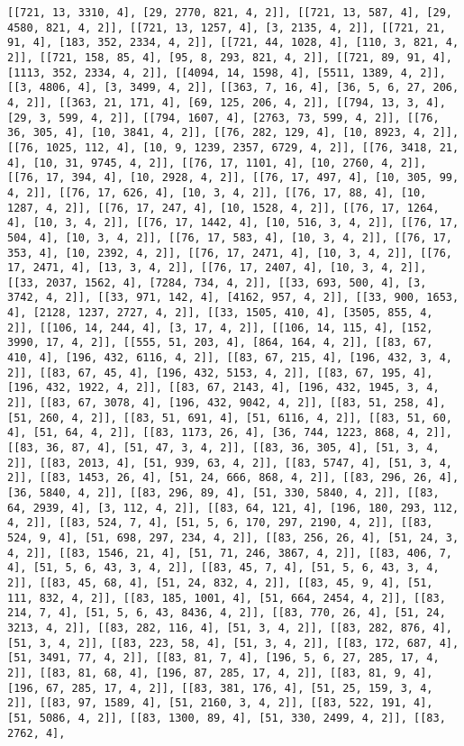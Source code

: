 \documentclass[12pt,fleqn]{article}\usepackage{../../common}
\begin{document}
\begin{verbatim}
[[721, 13, 3310, 4], [29, 2770, 821, 4, 2]], [[721, 13, 587, 4], [29, 4580, 821, 4, 2]], [[721, 13, 1257, 4], [3, 2135, 4, 2]], [[721, 21, 91, 4], [183, 352, 2334, 4, 2]], [[721, 44, 1028, 4], [110, 3, 821, 4, 2]], [[721, 158, 85, 4], [95, 8, 293, 821, 4, 2]], [[721, 89, 91, 4], [1113, 352, 2334, 4, 2]], [[4094, 14, 1598, 4], [5511, 1389, 4, 2]], [[3, 4806, 4], [3, 3499, 4, 2]], [[363, 7, 16, 4], [36, 5, 6, 27, 206, 4, 2]], [[363, 21, 171, 4], [69, 125, 206, 4, 2]], [[794, 13, 3, 4], [29, 3, 599, 4, 2]], [[794, 1607, 4], [2763, 73, 599, 4, 2]], [[76, 36, 305, 4], [10, 3841, 4, 2]], [[76, 282, 129, 4], [10, 8923, 4, 2]], [[76, 1025, 112, 4], [10, 9, 1239, 2357, 6729, 4, 2]], [[76, 3418, 21, 4], [10, 31, 9745, 4, 2]], [[76, 17, 1101, 4], [10, 2760, 4, 2]], [[76, 17, 394, 4], [10, 2928, 4, 2]], [[76, 17, 497, 4], [10, 305, 99, 4, 2]], [[76, 17, 626, 4], [10, 3, 4, 2]], [[76, 17, 88, 4], [10, 1287, 4, 2]], [[76, 17, 247, 4], [10, 1528, 4, 2]], [[76, 17, 1264, 4], [10, 3, 4, 2]], [[76, 17, 1442, 4], [10, 516, 3, 4, 2]], [[76, 17, 504, 4], [10, 3, 4, 2]], [[76, 17, 583, 4], [10, 3, 4, 2]], [[76, 17, 353, 4], [10, 2392, 4, 2]], [[76, 17, 2471, 4], [10, 3, 4, 2]], [[76, 17, 2471, 4], [13, 3, 4, 2]], [[76, 17, 2407, 4], [10, 3, 4, 2]], [[33, 2037, 1562, 4], [7284, 734, 4, 2]], [[33, 693, 500, 4], [3, 3742, 4, 2]], [[33, 971, 142, 4], [4162, 957, 4, 2]], [[33, 900, 1653, 4], [2128, 1237, 2727, 4, 2]], [[33, 1505, 410, 4], [3505, 855, 4, 2]], [[106, 14, 244, 4], [3, 17, 4, 2]], [[106, 14, 115, 4], [152, 3990, 17, 4, 2]], [[555, 51, 203, 4], [864, 164, 4, 2]], [[83, 67, 410, 4], [196, 432, 6116, 4, 2]], [[83, 67, 215, 4], [196, 432, 3, 4, 2]], [[83, 67, 45, 4], [196, 432, 5153, 4, 2]], [[83, 67, 195, 4], [196, 432, 1922, 4, 2]], [[83, 67, 2143, 4], [196, 432, 1945, 3, 4, 2]], [[83, 67, 3078, 4], [196, 432, 9042, 4, 2]], [[83, 51, 258, 4], [51, 260, 4, 2]], [[83, 51, 691, 4], [51, 6116, 4, 2]], [[83, 51, 60, 4], [51, 64, 4, 2]], [[83, 1173, 26, 4], [36, 744, 1223, 868, 4, 2]], [[83, 36, 87, 4], [51, 47, 3, 4, 2]], [[83, 36, 305, 4], [51, 3, 4, 2]], [[83, 2013, 4], [51, 939, 63, 4, 2]], [[83, 5747, 4], [51, 3, 4, 2]], [[83, 1453, 26, 4], [51, 24, 666, 868, 4, 2]], [[83, 296, 26, 4], [36, 5840, 4, 2]], [[83, 296, 89, 4], [51, 330, 5840, 4, 2]], [[83, 64, 2939, 4], [3, 112, 4, 2]], [[83, 64, 121, 4], [196, 180, 293, 112, 4, 2]], [[83, 524, 7, 4], [51, 5, 6, 170, 297, 2190, 4, 2]], [[83, 524, 9, 4], [51, 698, 297, 234, 4, 2]], [[83, 256, 26, 4], [51, 24, 3, 4, 2]], [[83, 1546, 21, 4], [51, 71, 246, 3867, 4, 2]], [[83, 406, 7, 4], [51, 5, 6, 43, 3, 4, 2]], [[83, 45, 7, 4], [51, 5, 6, 43, 3, 4, 2]], [[83, 45, 68, 4], [51, 24, 832, 4, 2]], [[83, 45, 9, 4], [51, 111, 832, 4, 2]], [[83, 185, 1001, 4], [51, 664, 2454, 4, 2]], [[83, 214, 7, 4], [51, 5, 6, 43, 8436, 4, 2]], [[83, 770, 26, 4], [51, 24, 3213, 4, 2]], [[83, 282, 116, 4], [51, 3, 4, 2]], [[83, 282, 876, 4], [51, 3, 4, 2]], [[83, 223, 58, 4], [51, 3, 4, 2]], [[83, 172, 687, 4], [51, 3491, 77, 4, 2]], [[83, 81, 7, 4], [196, 5, 6, 27, 285, 17, 4, 2]], [[83, 81, 68, 4], [196, 87, 285, 17, 4, 2]], [[83, 81, 9, 4], [196, 67, 285, 17, 4, 2]], [[83, 381, 176, 4], [51, 25, 159, 3, 4, 2]], [[83, 97, 1589, 4], [51, 2160, 3, 4, 2]], [[83, 522, 191, 4], [51, 5086, 4, 2]], [[83, 1300, 89, 4], [51, 330, 2499, 4, 2]], [[83, 2762, 4], 
\end{verbatim}
\end{document}
